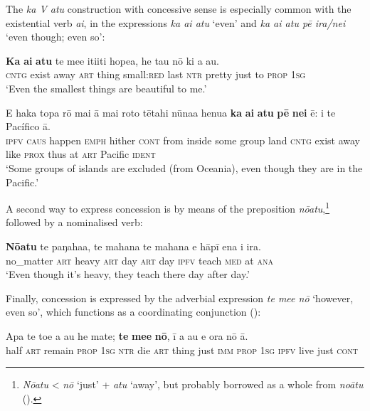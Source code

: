 The \textit{ka V atu} construction with concessive sense is especially common with the existential verb \textit{ai}, in the expressions \textit{ka ai atu} ‘even’ and \textit{ka ai atu pē ira/nei} ‘even though; even so’:

\ea\label{ex:11.267}
\gll \textbf{Ka} \textbf{ai} \textbf{atu} te me{\ꞌ}e {\ꞌ}iti{\ꞌ}iti hope{\ꞌ}a, he tau nō ki a au. \\
\textsc{cntg} exist away \textsc{art} thing small:\textsc{red} last \textsc{ntr} pretty just to \textsc{prop} \textsc{1sg} \\

\glt 
‘Even the smallest things are beautiful to me.’ \textstyleExampleref{[R224.037–038]}
\z

\ea\label{ex:11.268}
\gll E haka topa rō mai {\ꞌ}ā mai roto tētahi nūna{\ꞌ}a henua  \textbf{ka} \textbf{ai} \textbf{atu} \textbf{pē} \textbf{nei} ē: {\ꞌ}i te Pacífico {\ꞌ}ā.\\
\textsc{ipfv} \textsc{caus} happen \textsc{emph} hither \textsc{cont} from inside some group land  \textsc{cntg} exist away like \textsc{prox} thus at \textsc{art} Pacific \textsc{ident}\\

\glt 
‘Some groups of islands are excluded (from Oceania), even though they are in the Pacific.’ \textstyleExampleref{[R342.005]} 
\z

A second way to express concession is by means of the preposition \textit{nōatu},\footnote{\label{fn:537}\textit{Nōatu} {\textless} \textit{nō} ‘just’ + \textit{atu} ‘away’, but probably borrowed as a whole from  \textit{noātu} (\citealt[310]{AcadémieTahitienne1986}).} followed by a nominalised verb:

\ea\label{ex:11.269}
\gll \textbf{Nōatu} te paŋaha{\ꞌ}a, te mahana te mahana e hāpī ena {\ꞌ}i ira.\\
no\_matter \textsc{art} heavy \textsc{art} day \textsc{art} day \textsc{ipfv} teach \textsc{med} at \textsc{ana}\\

\glt 
‘Even though it's heavy, they teach there day after day.’ \textstyleExampleref{[R537.023]} 
\z

Finally, concession is expressed by the adverbial expression \textit{te me{\ꞌ}e nō} ‘however, even so’, which functions as a coordinating conjunction ():

\ea\label{ex:11.270}
\gll {\ꞌ}Apa te toe a au he mate; \textbf{te} \textbf{me{\ꞌ}e} \textbf{nō}, {\ꞌ}ī a au e ora nō {\ꞌ}ā.\\
half \textsc{art} remain \textsc{prop} \textsc{1sg} \textsc{ntr} die \textsc{art} thing just \textsc{imm} \textsc{prop} \textsc{1sg} \textsc{ipfv} live just \textsc{cont}\\

